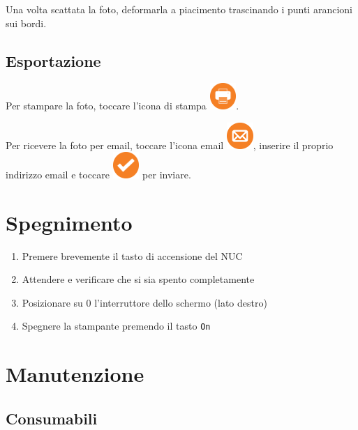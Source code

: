 \documentclass[12pt]{article}
\begin{document}
		Una volta scattata la foto, deformarla a piacimento trascinando i punti arancioni sui bordi.        
	
	
	\subsection{Esportazione}
	
		Per stampare la foto, toccare l'icona di stampa \includegraphics[width=1cm]{../src/resource/icons/print.png}.
		
		Per ricevere la foto per email, toccare l'icona email \includegraphics[width=1cm]{../src/resource/icons/mail.png}, inserire il proprio indirizzo email e toccare \includegraphics[width=1cm]{../src/resource/icons/ok.png} per inviare.
		
	
	
\section{Spegnimento}
	
		\begin{enumerate}
			\item Premere brevemente il tasto di accensione del NUC
			\item Attendere e verificare che si sia spento completamente
			\item Posizionare su 0 l'interruttore dello schermo (lato destro)
			\item Spegnere la stampante premendo il tasto \texttt{On}
		\end{enumerate}
	
	
	
\section{Manutenzione}

	\subsection{Consumabili}
	
\end{document}

